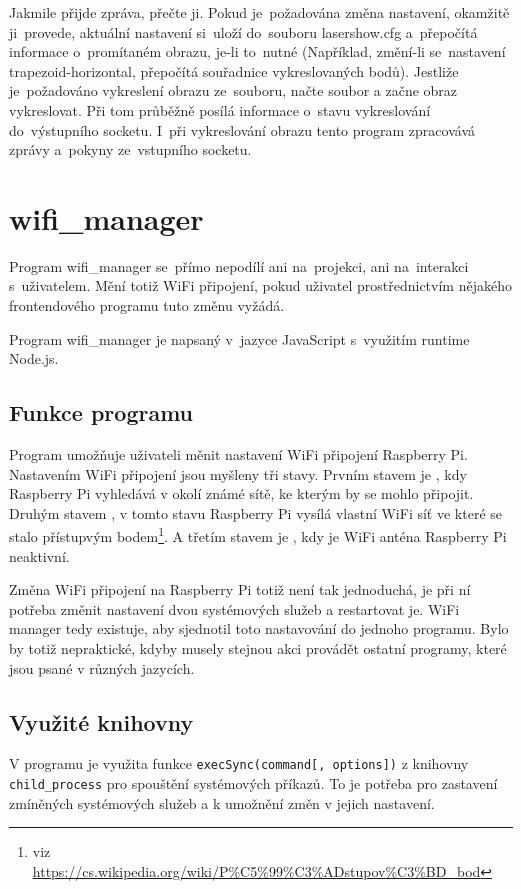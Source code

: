 Jakmile přijde zpráva, přečte ji. Pokud je~požadována změna nastavení, okamžitě ji~provede, aktuální nastavení si~uloží do~souboru lasershow.cfg a~přepočítá informace o~promítaném obrazu, je-li to~nutné (Například, změní-li se~nastavení trapezoid-horizontal, přepočítá souřadnice vykreslovaných bodů).
Jestliže je~požadováno vykreslení obrazu ze~souboru, načte soubor a začne obraz vykreslovat.
Při tom průběžně posílá informace o~stavu vykreslování do~výstupního socketu.
I~při vykreslování obrazu tento program zpracovává zprávy a~pokyny ze~vstupního socketu.

\section{wifi\_manager}

Program wifi\_manager se~přímo nepodílí ani na~projekci, ani na~interakci s~uživatelem. Mění totiž WiFi připojení, pokud uživatel prostřednictvím nějakého frontendového programu tuto změnu vyžádá.

Program wifi\_manager je napsaný v~jazyce JavaScript s~využitím runtime Node.js.

\subsection{Funkce programu}
Program umožňuje uživateli měnit nastavení WiFi připojení Raspberry Pi. Nastavením WiFi připojení jsou myšleny tři stavy.
Prvním stavem je , kdy Raspberry Pi vyhledává v okolí známé sítě, ke kterým by se mohlo připojit.
Druhým stavem , v tomto stavu Raspberry Pi vysílá vlastní WiFi síť ve které se stalo přístupvým bodem\footnote{viz \url{https://cs.wikipedia.org/wiki/P\%C5\%99\%C3\%ADstupov\%C3\%BD\_bod}}.
A třetím stavem je , kdy je WiFi anténa Raspberry Pi neaktivní.

Změna WiFi připojení na Raspberry Pi totiž není tak jednoduchá, je při ní potřeba změnit nastavení dvou systémových služeb a restartovat je.
WiFi manager tedy existuje, aby sjednotil toto nastavování do jednoho programu. Bylo by totiž nepraktické, kdyby musely stejnou akci provádět ostatní programy, které jsou psané v různých jazycích.

\subsection{Využité knihovny}
V programu je využita funkce \texttt{execSync(command[, options])} z knihovny \texttt{child_process} pro spouštění systémových příkazů. To je potřeba pro zastavení zmíněných systémových služeb a k umožnění změn v jejich nastavení.

